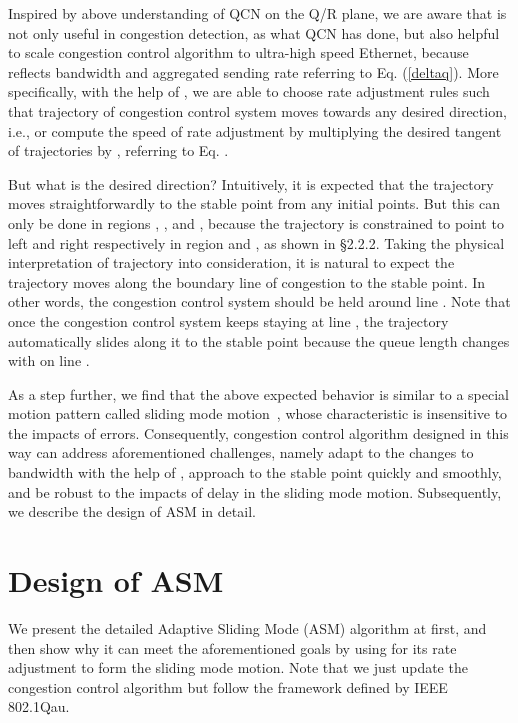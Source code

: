 \documentclass{sig-alternate-10pt}
\begin{document}
Inspired by above understanding of QCN on the Q/R plane, we are aware that  is not only useful in congestion detection, as what QCN has done, but also helpful to scale congestion control algorithm to ultra-high speed Ethernet, because  reflects bandwidth and  aggregated sending rate referring to Eq. (\ref{deltaq}). More specifically, with the help of , we are able to choose rate adjustment rules such that trajectory of congestion control system moves towards any desired direction, i.e.,  or compute the speed of rate adjustment by multiplying the desired tangent  of trajectories by , referring to Eq. .


But what is the desired direction? Intuitively, it is expected that the trajectory moves straightforwardly to the stable point  from any initial points. But this can only be done in regions , ,  and , because the trajectory is constrained to point to left and right respectively in region  and , as shown in \S2.2.2. Taking the physical interpretation of trajectory into consideration, it is natural to expect the trajectory moves along the boundary line  of congestion  to the stable point. In other words, the congestion control system should be held around line . Note that once the congestion control system keeps staying at line , the trajectory automatically slides along it to the stable point because the queue length changes with  on line .


As a step further, we find that the above expected behavior is similar to a special motion pattern called sliding mode motion~\cite{Itkis}, whose characteristic is insensitive to the impacts of errors. Consequently, congestion control algorithm designed in this way can address aforementioned challenges, namely adapt to the changes to bandwidth with the help of , approach to the stable point quickly and smoothly, and be robust to the impacts of delay in the sliding mode motion. Subsequently, we describe the design of ASM in detail. 


\section{Design of ASM}
We present the detailed Adaptive Sliding Mode (ASM) algorithm at first, and then show why it can meet the aforementioned goals by using  for its rate adjustment to form the sliding mode motion. Note that we just update the congestion control algorithm but follow the framework defined by IEEE 802.1Qau. 
\end{document}
